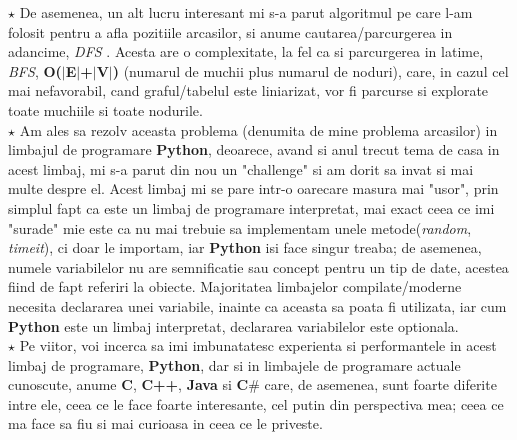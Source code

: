 \documentclass{article}
\begin{document}
$\star$ De asemenea, un alt lucru interesant mi s-a parut algoritmul pe care l-am folosit pentru a afla pozitiile arcasilor, si anume cautarea/parcurgerea in adancime, \textit{DFS} . Acesta are o complexitate, la fel ca si parcurgerea in latime, \textit{BFS}, \textbf{O($|$E$|$+$|$V$|$)} (numarul de muchii plus numarul de noduri), care, in cazul cel mai nefavorabil, cand graful/tabelul este liniarizat, vor fi parcurse si explorate toate muchiile si toate nodurile.\\

$\star$ Am ales sa rezolv aceasta problema (denumita de mine problema arcasilor) in limbajul de programare \textbf{Python}, deoarece, avand si anul trecut tema de casa in acest limbaj, mi s-a parut din nou un "challenge" si am dorit sa invat si mai multe despre el. Acest limbaj mi se pare intr-o oarecare masura mai "usor", prin simplul fapt ca este un limbaj de programare interpretat, mai exact ceea ce imi "surade" mie este ca nu mai trebuie sa implementam unele metode(\textit{random}, \textit{timeit}), ci doar le importam, iar \textbf{Python} isi face singur treaba; de asemenea, numele variabilelor nu are semnificatie sau concept pentru un tip de date, acestea fiind de fapt referiri la obiecte. Majoritatea limbajelor compilate/moderne necesita declararea unei variabile, inainte ca aceasta sa poata fi utilizata, iar cum \textbf{Python} este un limbaj interpretat, declararea variabilelor este optionala. \\ 

$\star$ Pe viitor, voi incerca sa imi imbunatatesc experienta si performantele in acest limbaj de programare, \textbf{Python}, dar si in limbajele de programare actuale cunoscute, anume \textbf{C}, \textbf{C++}, \textbf{Java} si \textbf{C$\#$} care, de asemenea, sunt foarte diferite intre ele, ceea ce le face foarte interesante, cel putin din perspectiva mea; ceea ce ma face sa fiu si mai curioasa in ceea ce le priveste.



\newpage 
\end{document}

